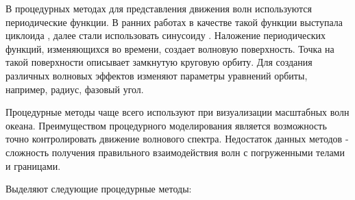 В процедурных методах для представления движения волн используются периодические функции. В ранних работах в качестве такой функции выступала циклоида \cite{orbit-procedure}, далее стали использовать синусоиду \cite{spectrum-darles}. Наложение периодических функций, изменяющихся во времени, создает волновую поверхность. Точка на такой поверхности описывает замкнутую круговую орбиту. Для создания различных волновых эффектов изменяют параметры уравнений орбиты, например, радиус, фазовый угол.

Процедурные методы чаще всего используют при визуализации масштабных волн океана. Преимуществом процедурного моделирования является возможность точно контролировать движение волнового спектра. Недостаток данных методов - сложность получения правильного взаимодействия волн с погруженными телами и границами.  

Выделяют следующие процедурные методы:

